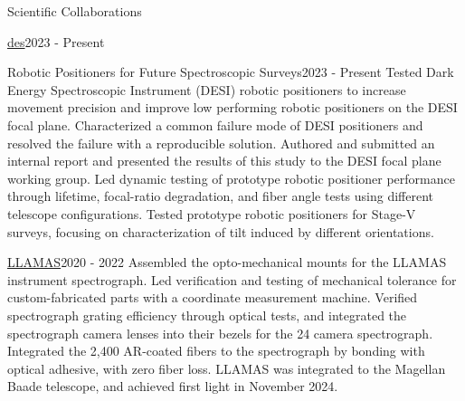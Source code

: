 \begin{rSection}{Scientific Collaborations}
\begin{rSubsection}{\href{https://www.darkenergysurvey.org/}{\ac{des}}}{2023 - Present}{}{}
\end{rSubsection}


\begin{rSubsection}{Robotic Positioners for Future Spectroscopic Surveys}{2023 - Present}{}{}
Tested Dark Energy Spectroscopic Instrument (DESI) robotic positioners to increase movement precision and improve low performing robotic positioners on the DESI focal plane. Characterized a common failure mode of DESI positioners and resolved the failure with a reproducible solution. Authored and submitted an internal report and presented the results of this study to the DESI focal plane working group. Led dynamic testing of prototype robotic positioner performance through lifetime, focal-ratio degradation, and fiber angle tests using different telescope configurations. Tested prototype robotic positioners for Stage-V surveys, focusing on characterization of tilt induced by different orientations.
\end{rSubsection}

\begin{rSubsection}{\href{https://ait.mit.edu/instruments/llamas/}{\ac{LLAMAS}}}{2020 - 2022}{}{}
Assembled the opto-mechanical mounts for the \ac{LLAMAS} instrument spectrograph. Led verification and testing of mechanical tolerance for custom-fabricated parts with a coordinate measurement machine. Verified spectrograph grating efficiency through optical tests, and integrated the spectrograph camera lenses into their bezels for the 24 camera spectrograph. Integrated the 2,400 AR-coated fibers to the spectrograph by bonding with optical adhesive, with zero fiber loss. LLAMAS was integrated to the Magellan Baade telescope, and achieved first light in November 2024.
\end{rSubsection}


\end{rSection}
